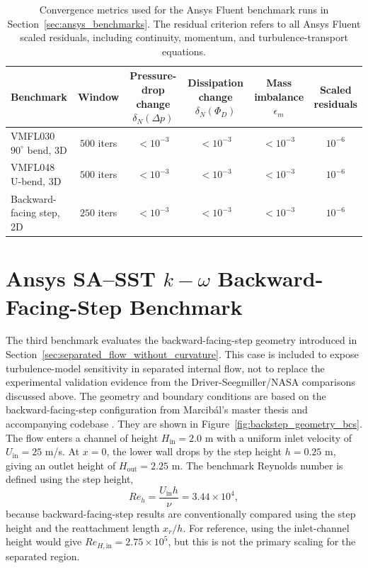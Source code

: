\begin{table}[!ht]
	\centering
	\scriptsize
	\caption{Convergence metrics used for the Ansys Fluent benchmark runs in Section~\ref{sec:ansys_benchmarks}. The residual criterion refers to all Ansys Fluent scaled residuals, including continuity, momentum, and turbulence-transport equations.}
	\label{tab:ch2_ansys_convergence_metrics}
	\renewcommand{\arraystretch}{1.2}
	\begin{tabularx}{\textwidth}{X c c c c c}
		\hline
		\textbf{Benchmark} &
		\textbf{Window} &
		\shortstack{\textbf{Pressure-drop}\\\textbf{change}\\$\delta_N(\Delta p)$} &
		\shortstack{\textbf{Dissipation}\\\textbf{change}\\$\delta_N(\Phi_D)$} &
		\shortstack{\textbf{Mass}\\\textbf{imbalance}\\$\epsilon_m$} &
		\shortstack{\textbf{Scaled}\\\textbf{residuals}} \\
		\hline
		VMFL030 $90^\circ$ bend, 3D & $500$ iters & $<10^{-3}$ & $<10^{-3}$ & $<10^{-3}$ & $10^{-6}$ \\
		VMFL048 U-bend, 3D & $500$ iters & $<10^{-3}$ & $<10^{-3}$ & $<10^{-3}$ & $10^{-6}$ \\
		Backward-facing step, 2D & $250$ iters & $<10^{-3}$ & $<10^{-3}$ & $<10^{-3}$ & $10^{-6}$ \\
		\hline
	\end{tabularx}
\end{table}

\section{Ansys SA--\texorpdfstring{SST $k-\omega$}{SST k-omega} Backward-Facing-Step Benchmark}
\label{sec:app_A_backstep_ansys_comparison}
The third benchmark evaluates the backward-facing-step geometry introduced in Section~\ref{sec:separated_flow_without_curvature}. This case is included to expose turbulence-model sensitivity in separated internal flow, not to replace the experimental validation evidence from the Driver-Seegmiller/NASA comparisons discussed above. The geometry and boundary conditions are based on the backward-facing-step configuration from Marcib\'{a}l's master thesis and accompanying codebase \cite{Marcibal2024,joove_keps}. They are shown in Figure~\ref{fig:backstep_geometry_bcs}. The flow enters a channel of height $H_\mathrm{in}=2.0$ m with a uniform inlet velocity of $U_\mathrm{in}=25$ m/s. At $x=0$, the lower wall drops by the step height $h=0.25$ m, giving an outlet height of $H_\mathrm{out}=2.25$ m. The benchmark Reynolds number is defined using the step height,
\begin{equation}
	Re_h = \frac{U_\mathrm{in} h}{\nu} = 3.44 \times 10^4 ,
\end{equation}
because backward-facing-step results are conventionally compared using the step height and the reattachment length $x_r/h$. For reference, using the inlet-channel height would give $Re_{H,\mathrm{in}} = 2.75 \times 10^5$, but this is not the primary scaling for the separated region.

